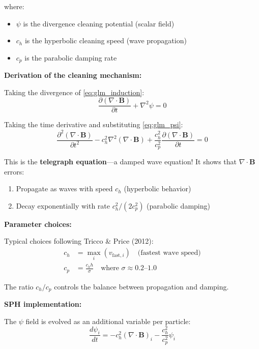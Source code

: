 \documentclass[12pt,a4paper]{article}
\begin{document}
where:
\begin{itemize}
    \item $\psi$ is the divergence cleaning potential (scalar field)
    \item $c_h$ is the hyperbolic cleaning speed (wave propagation)
    \item $c_p$ is the parabolic damping rate
\end{itemize}

\textbf{Derivation of the cleaning mechanism:}

Taking the divergence of \eqref{eq:glm_induction}:
\begin{equation}
\frac{\partial (\nabla \cdot \bm{B})}{\partial t} + \nabla^2 \psi = 0
\end{equation}

Taking the time derivative and substituting \eqref{eq:glm_psi}:
\begin{equation}
\frac{\partial^2 (\nabla \cdot \bm{B})}{\partial t^2}
- c_h^2 \nabla^2 (\nabla \cdot \bm{B})
+ \frac{c_h^2}{c_p^2} \frac{\partial (\nabla \cdot \bm{B})}{\partial t} = 0
\label{eq:telegraph}
\end{equation}

This is the \textbf{telegraph equation}---a damped wave equation! It shows that
$\nabla \cdot \bm{B}$ errors:
\begin{enumerate}
    \item Propagate as waves with speed $c_h$ (hyperbolic behavior)
    \item Decay exponentially with rate $c_h^2/(2c_p^2)$ (parabolic damping)
\end{enumerate}

\textbf{Parameter choices:}

Typical choices following Tricco \& Price (2012):
\begin{align}
c_h &= \max_i(v_{\text{fast},i}) \quad \text{(fastest wave speed)} \\
c_p &= \frac{c_h h}{\sigma} \quad \text{where } \sigma \approx 0.2\text{--}1.0
\end{align}

The ratio $c_h/c_p$ controls the balance between propagation and damping.

\textbf{SPH implementation:}

The $\psi$ field is evolved as an additional variable per particle:
\begin{equation}
\frac{d\psi_i}{dt} = -c_h^2 (\nabla \cdot \bm{B})_i - \frac{c_h^2}{c_p^2}\psi_i
\label{eq:psi_evolution_sph}
\end{equation}
\end{document}
